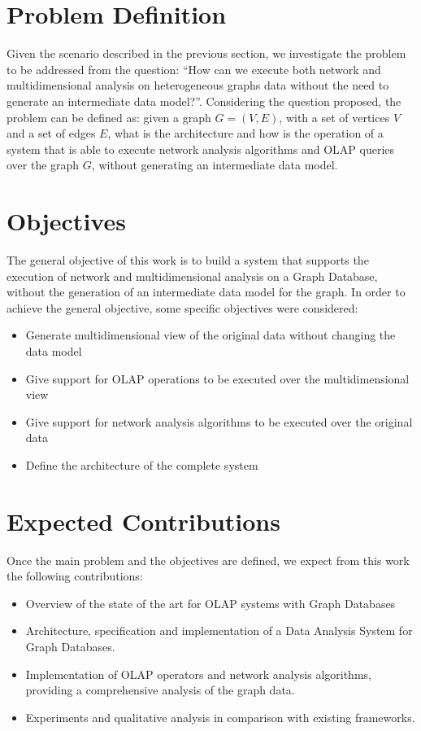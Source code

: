 \section{Problem Definition}
Given the scenario described in the previous section, we investigate the problem to be addressed from the question: ``How can we execute both network and multidimensional analysis on heterogeneous graphs data without the need to generate an intermediate data model?''. Considering the question proposed, the problem can be defined as: given a graph $G=(V,E)$, with a set of vertices $V$ and a set of edges $E$, what is the architecture and how is the operation of a system that is able to execute network analysis algorithms and OLAP queries over the graph $G$, without generating an intermediate data model.

\section{Objectives}
The general objective of this work is to build a system that supports the execution of network and multidimensional analysis on a Graph Database, without the generation of an intermediate data model for the graph. In order to achieve the general objective, some specific objectives were considered:
\begin{itemize}
\item Generate multidimensional view of the original data without changing the data model
\item Give support for OLAP operations to be executed over the multidimensional view
\item Give support for network analysis algorithms to be executed over the original data
\item Define the architecture of the complete system
\end{itemize}

\section{Expected Contributions}
Once the main problem and the objectives are defined, we expect from this work the following contributions:

\begin{itemize}
\item Overview of the state of the art for OLAP systems with Graph Databases
\item Architecture, specification and implementation of a Data Analysis System for Graph Databases.
\item Implementation of OLAP operators and network analysis algorithms, providing a comprehensive analysis of the graph data.
\item Experiments and qualitative analysis in comparison with existing frameworks.
\end{itemize}


